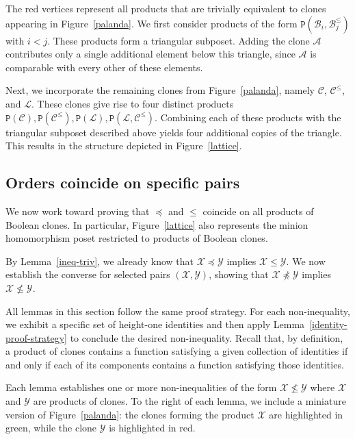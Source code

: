 \documentclass{amsart}
\numberwithin{equation}{section}
\theoremstyle{plain}
\theoremstyle{definition}
\def\clone#1{\mathcal{#1}}
\def\Bc{\clone{B}}
\def\Ac{\clone{A}}
\def\Lc{\clone{L}}
\def\Cc{\clone{C}}
\def\C#1{{\mathtt{P}}(#1)}
\begin{document}
The red vertices represent all products that are trivially equivalent to clones appearing in Figure~\ref{palanda}. We first consider products of the form $\C{\Bc_i,\Bc_j^{\leq}}$ with $i<j$. These products form a triangular subposet. Adding the clone $\Ac$ contributes only a single additional element below this triangle, since $\Ac$ is comparable with every other of these elements. 

Next, we incorporate the remaining clones from Figure~\ref{palanda}, namely $\Cc$, $\Cc^{\leq}$, and $\Lc$. These clones give rise to four distinct products  $\C{\Cc}, \C{\Cc^{\leq}}, \C{\Lc}, \C{\Lc,\Cc^{\leq}}.$ Combining each of these products with the triangular subposet described above yields four additional copies of the triangle. This results in the structure depicted in Figure~\ref{lattice}.

\begin{figure}
\end{figure}

\subsection{Orders coincide on specific pairs}


We now work toward proving that $\preceq$ and $\leq$ coincide on all products of Boolean clones. In particular, Figure~\ref{lattice} also represents the minion homomorphism poset restricted to products of Boolean clones.

By Lemma~\ref{ineq-triv}, we already know that $\clone{X} \preceq \clone{Y}$ implies $\clone{X} \leq \clone{Y}$. We now establish the converse for selected pairs $(\clone{X},\clone{Y})$, showing that $\clone{X}\not\preceq\clone{Y}$ implies $\clone{X}\not\leq\clone{Y}$.

All lemmas in this section follow the same proof strategy. For each non-inequality, we exhibit a specific set of height-one identities and then apply Lemma~\ref{identity-proof-strategy} to conclude the desired non-inequality. Recall that, by definition, a product of clones contains a function satisfying a given collection of identities if and only if each of its components contains a function satisfying those identities. 

Each lemma establishes one or more non-inequalities of the form $\clone{X}\not\leq \clone{Y}$ where $\clone{X}$ and $\clone{Y}$ are products of clones. To the right of each lemma, we include a miniature version of Figure~\ref{palanda}: the clones forming the product $\clone{X}$ are highlighted in green, while the clone $\clone{Y}$ is highlighted in red. 
\end{document}
